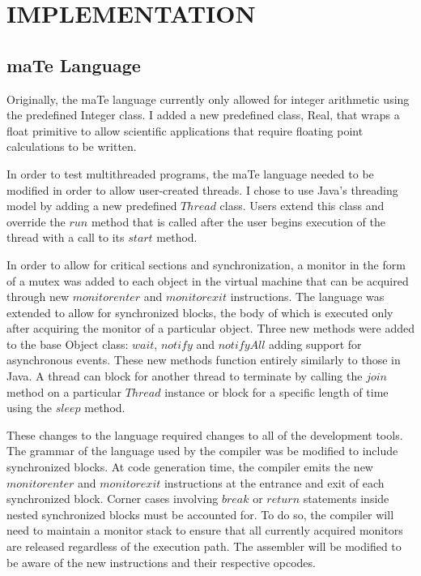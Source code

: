 \chapter{IMPLEMENTATION}
\label{IMPLEMENTATION}

\section{maTe Language}

Originally, the maTe language currently only allowed for integer
arithmetic using the predefined Integer class.  I added a new
predefined class, Real, that wraps a float primitive to allow
scientific applications that require floating point calculations to be
written.

In order to test multithreaded programs, the maTe language needed to
be modified in order to allow user-created threads.  I chose to use
Java's threading model by adding a new predefined $Thread$ class.
Users extend this class and override the $run$ method that is called
after the user begins execution of the thread with a call to its
$start$ method.

In order to allow for critical sections and synchronization, a monitor
in the form of a mutex was added to each object in the virtual machine
that can be acquired through new $monitorenter$ and $monitorexit$
instructions.  The language was extended to allow for synchronized
blocks, the body of which is executed only after acquiring the monitor
of a particular object.  Three new methods were added to the base
Object class: $wait$, $notify$ and $notifyAll$ adding support for
asynchronous events.  These new methods function entirely similarly to
those in Java.  A thread can block for another thread to terminate by
calling the $join$ method on a particular $Thread$ instance or block
for a specific length of time using the $sleep$ method.

These changes to the language required changes to all of the
development tools.  The grammar of the language used by the compiler
was be modified to include synchronized blocks.  At code generation
time, the compiler emits the new $monitorenter$ and $monitorexit$
instructions at the entrance and exit of each synchronized block.
Corner cases involving $break$ or $return$ statements inside nested
synchronized blocks must be accounted for.  To do so, the compiler
will need to maintain a monitor stack to ensure that all currently
acquired monitors are released regardless of the execution path.  The
assembler will be modified to be aware of the new instructions and
their respective opcodes.

